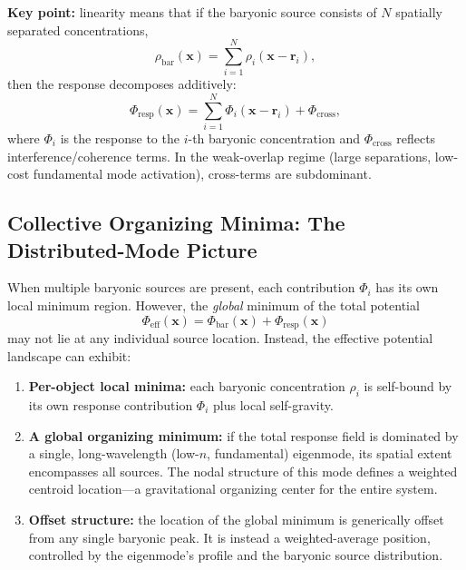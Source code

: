 \documentclass[11pt]{article}
\begin{document}
\textbf{Key point:} linearity means that if the baryonic source consists of $N$ 
spatially separated concentrations,
\[
  \rho_{\text{bar}}(\mathbf{x}) = \sum_{i=1}^{N} \rho_i(\mathbf{x} - \mathbf{r}_i),
\]
then the response decomposes additively:
\begin{equation}
  \Phi_{\text{resp}}(\mathbf{x}) = \sum_{i=1}^{N} \Phi_i(\mathbf{x} - \mathbf{r}_i) 
  + \Phi_{\text{cross}},
\label{eq:distributed-superposition}
\end{equation}
where $\Phi_i$ is the response to the $i$-th baryonic concentration and $\Phi_{\text{cross}}$ 
reflects interference/coherence terms. In the weak-overlap regime (large separations, 
low-cost fundamental mode activation), cross-terms are subdominant.

\subsection{Collective Organizing Minima: The Distributed-Mode Picture}\label{e.3-collective-minima}

When multiple baryonic sources are present, each contribution $\Phi_i$ has its own local 
minimum region. However, the \textit{global} minimum of the total potential
\begin{equation}
  \Phi_{\text{eff}}(\mathbf{x}) = \Phi_{\text{bar}}(\mathbf{x}) + \Phi_{\text{resp}}(\mathbf{x})
\label{eq:total-effective-potential}
\end{equation}
may not lie at any individual source location. Instead, the effective potential landscape 
can exhibit:

\begin{enumerate}
  \item \textbf{Per-object local minima:} each baryonic concentration $\rho_i$ is self-bound 
    by its own response contribution $\Phi_i$ plus local self-gravity.
  
  \item \textbf{A global organizing minimum:} if the total response field is dominated by 
    a single, long-wavelength (low-$n$, fundamental) eigenmode, its spatial extent encompasses 
    all sources. The nodal structure of this mode defines a weighted centroid location---a 
    gravitational organizing center for the entire system.
  
  \item \textbf{Offset structure:} the location of the global minimum is generically offset 
    from any single baryonic peak. It is instead a weighted-average position, controlled by 
    the eigenmode's profile and the baryonic source distribution.
\end{enumerate}
\end{document}
